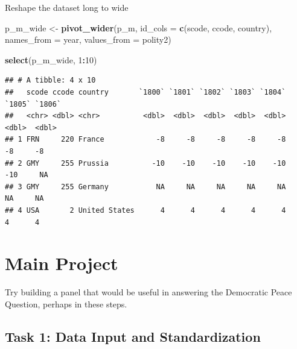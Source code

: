 \documentclass[
]{book}
\newenvironment{Shaded}{\begin{snugshade}}{\end{snugshade}}
\newcommand{\DataTypeTok}[1]{\textcolor[rgb]{0.13,0.29,0.53}{#1}}
\newcommand{\DecValTok}[1]{\textcolor[rgb]{0.00,0.00,0.81}{#1}}
\newcommand{\KeywordTok}[1]{\textcolor[rgb]{0.13,0.29,0.53}{\textbf{#1}}}
\newcommand{\NormalTok}[1]{#1}
\newcommand{\OperatorTok}[1]{\textcolor[rgb]{0.81,0.36,0.00}{\textbf{#1}}}
\newcommand{\StringTok}[1]{\textcolor[rgb]{0.31,0.60,0.02}{#1}}
\theoremstyle{definition}
\theoremstyle{definition}
\theoremstyle{definition}
\theoremstyle{remark}
\begin{document}
\begin{Shaded}
\end{Shaded}

Reshape the dataset long to wide

\begin{Shaded}
\begin{Highlighting}[]
\NormalTok{p\_m\_wide <{-}}\StringTok{ }\KeywordTok{pivot\_wider}\NormalTok{(p\_m, }
                        \DataTypeTok{id\_cols =} \KeywordTok{c}\NormalTok{(scode, ccode, country),}
                        \DataTypeTok{names\_from =}\NormalTok{ year,}
                        \DataTypeTok{values\_from =}\NormalTok{ polity2)}

\KeywordTok{select}\NormalTok{(p\_m\_wide, }\DecValTok{1}\OperatorTok{:}\DecValTok{10}\NormalTok{)}
\end{Highlighting}
\end{Shaded}

\begin{verbatim}
## # A tibble: 4 x 10
##   scode ccode country       `1800` `1801` `1802` `1803` `1804` `1805` `1806`
##   <chr> <dbl> <chr>          <dbl>  <dbl>  <dbl>  <dbl>  <dbl>  <dbl>  <dbl>
## 1 FRN     220 France            -8     -8     -8     -8     -8     -8     -8
## 2 GMY     255 Prussia          -10    -10    -10    -10    -10    -10     NA
## 3 GMY     255 Germany           NA     NA     NA     NA     NA     NA     NA
## 4 USA       2 United States      4      4      4      4      4      4      4
\end{verbatim}

\hypertarget{main-project}{%
\section{Main Project}\label{main-project}}

Try building a panel that would be useful in answering the Democratic Peace Question, perhaps in these steps.

\hypertarget{task-1-data-input-and-standardization}{%
\subsection*{Task 1: Data Input and Standardization}\label{task-1-data-input-and-standardization}}
\end{document}
